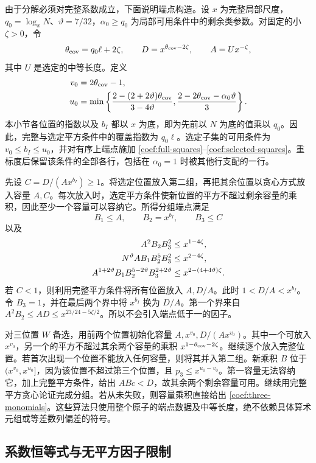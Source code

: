 由于分解必须对完整系数成立，下面说明端点构造。设 $x$ 为完整局部尺度，$q_0=\log_x N$、$\vartheta=7/32$，$\alpha_0\ge q_0$ 为局部可用条件中的剩余类参数。对固定的小 $\zeta>0$，令
\[
 \theta_{\rm cov}=q_0\ell+2\zeta,\qquad D=x^{\theta_{\rm cov}-2\zeta},
 \qquad A=Ux^{-\zeta},
\]
其中 $U$ 是选定的中等长度。定义
\begin{align*}
 v_0&=2\theta_{\rm cov}-1,\\
 u_0&=\min\left\{
 \frac{2-(2+2\vartheta)\theta_{\rm cov}}{3-4\vartheta},
 \frac{2-2\theta_{\rm cov}-\alpha_0\vartheta}{3}\right\}.
\end{align*}
本小节各位置的指数以及 $b_I$ 都以 $x$ 为底，即为先前以 $N$ 为底的值乘以 $q_0$。因此，完整与选定平方条件中的覆盖指数为 $q_0\ell$。选定子集的可用条件为 $v_0\le b_I\le u_0$，并对有序上端点施加 \eqref{coef:full-squares}--\eqref{coef:selected-squares}。重标度后保留该条件的全部各行，包括在 $\alpha_0=1$ 时被其他行支配的一行。

先设 $C=D/(Ax^{b_I})\ge1$。将选定位置放入第二组，再把其余位置以贪心方式放入容量 $A,C$。每次放入时，选定平方条件使新位置的平方不超过剩余容量的乘积，因此至少一个容量可以容纳它。所得分组端点满足
\[
 B_1\le A,\qquad B_2=x^{b_I},\qquad B_3\le C
\]
以及
\begin{align}
 A^2B_2B_3^2&\le x^{1-4\zeta},\notag\\
 N^\vartheta AB_1B_2^5B_3^2&\le x^{2-4\zeta},
 \label{coef:three-monomials}\\
 A^{1+2\vartheta}B_1B_2^{5-2\vartheta}B_3^{2+2\vartheta}
 &\le x^{2-(4+4\vartheta)\zeta}.\notag
\end{align}
若 $C<1$，则利用完整平方条件将所有位置放入 $A,D/A$。此时 $1<D/A<x^{b_I}$。令 $B_3=1$，并在最后两个界中将 $x^{b_I}$ 换为 $D/A$。第一个界来自 $A^2B_2\le AD\le x^{23/24-5\zeta/2}$。所以不会引入端点低于一的因子。

对三位置 $W$ 备选，用前两个位置初始化容量 $A,x^{v_0},D/(Ax^{v_0})$。其中一个可放入 $x^{v_0}$，另一个的平方不超过其余两个容量的乘积 $x^{1-\theta_{\rm cov}-2\zeta}$。继续逐个放入完整位置。若首次出现一个位置不能放入任何容量，则将其并入第二组。新乘积 $B$ 位于 $(x^{v_0},x^{u_0}]$，因为该位置不超过第三个位置，且 $p_3\le x^{u_0-v_0}$。第一容量无法容纳它，加上完整平方条件，给出 $ABc<D$，故其余两个剩余容量可用。继续用完整平方贪心论证完成分组。若从未失败，则容量乘积直接给出 \eqref{coef:three-monomials}。这些算法只使用整个原子的端点数据及中等长度，绝不依赖具体算术元组或等差数列偏差的符号。

\subsection{系数恒等式与无平方因子限制}

